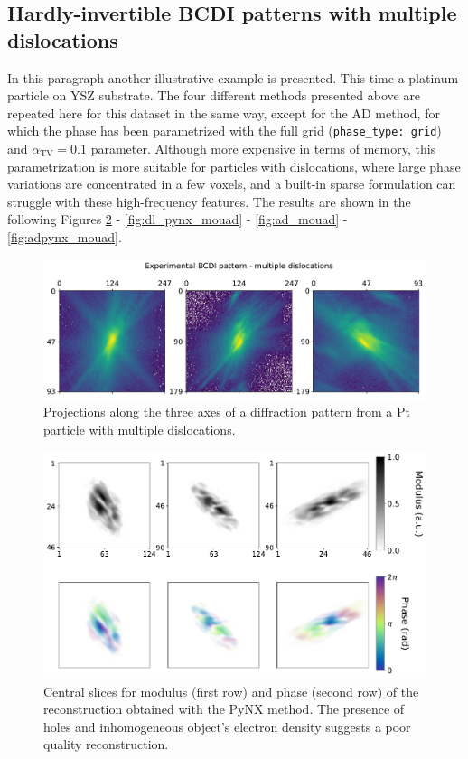 \subsection{Hardly-invertible BCDI patterns with multiple dislocations}

In this paragraph another illustrative example is presented. This time a platinum particle on YSZ substrate. 
The four different methods presented above are repeated here for this dataset in the same way, except for the AD method, 
for which the phase has been parametrized with the full grid (\texttt{phase\_type: grid}) 
and $ \alpha_{\text{TV}} = 0.1 $ parameter. Although more 
expensive in terms of memory, this parametrization is more suitable for particles with dislocations, where large phase 
variations are concentrated in a few voxels, and a built-in sparse formulation can struggle with these high-frequency 
features. The results are shown in  
the following Figures \ref{fig:pynx_mouad} - \ref{fig:dl_pynx_mouad} - \ref{fig:ad_mouad} - \ref{fig:adpynx_mouad}. 
 

\begin{figure}[H]
  \centering
  \includegraphics[width=\textwidth]{figures/AD/projections_mouad.pdf}
  \caption{Projections along the three axes of a diffraction pattern from a Pt particle with multiple dislocations. }
  \label{fig:projectsions_mouad}
\end{figure}

\begin{figure}[H]
  \centering
  \includegraphics[width=\textwidth]{figures/AD/pynx_mouad.pdf}
  \caption{Central slices for modulus (first row) and phase (second row) of the reconstruction obtained with the PyNX method.
  The presence of holes and inhomogeneous object's electron density suggests a poor quality reconstruction. }
  \label{fig:pynx_mouad}
\end{figure}

